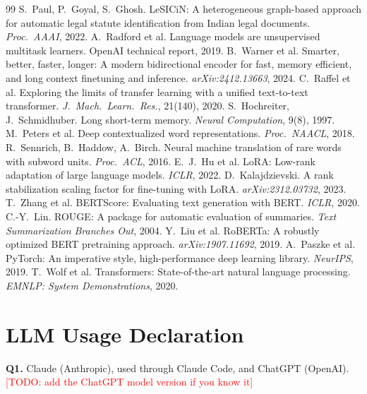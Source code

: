 \documentclass[10pt,a4paper]{article}
\newcommand{\todo}[1]{\textcolor{red}{[TODO: #1]}}
\begin{document}
\begin{thebibliography}{99}
 S.~Paul, P.~Goyal, S.~Ghosh. LeSICiN: A heterogeneous graph-based approach for automatic legal statute identification from Indian legal documents. \emph{Proc.\ AAAI}, 2022.
 A.~Radford et al. Language models are unsupervised multitask learners. OpenAI technical report, 2019.
 B.~Warner et al. Smarter, better, faster, longer: A modern bidirectional encoder for fast, memory efficient, and long context finetuning and inference. \emph{arXiv:2412.13663}, 2024.
 C.~Raffel et al. Exploring the limits of transfer learning with a unified text-to-text transformer. \emph{J.\ Mach.\ Learn.\ Res.}, 21(140), 2020.
 S.~Hochreiter, J.~Schmidhuber. Long short-term memory. \emph{Neural Computation}, 9(8), 1997.
 M.~Peters et al. Deep contextualized word representations. \emph{Proc.\ NAACL}, 2018.
 R.~Sennrich, B.~Haddow, A.~Birch. Neural machine translation of rare words with subword units. \emph{Proc.\ ACL}, 2016.
 E.~J.~Hu et al. LoRA: Low-rank adaptation of large language models. \emph{ICLR}, 2022.
 D.~Kalajdzievski. A rank stabilization scaling factor for fine-tuning with LoRA. \emph{arXiv:2312.03732}, 2023.
 T.~Zhang et al. BERTScore: Evaluating text generation with BERT. \emph{ICLR}, 2020.
 C.-Y.~Lin. ROUGE: A package for automatic evaluation of summaries. \emph{Text Summarization Branches Out}, 2004.
 Y.~Liu et al. RoBERTa: A robustly optimized BERT pretraining approach. \emph{arXiv:1907.11692}, 2019.
 A.~Paszke et al. PyTorch: An imperative style, high-performance deep learning library. \emph{NeurIPS}, 2019.
 T.~Wolf et al. Transformers: State-of-the-art natural language processing. \emph{EMNLP: System Demonstrations}, 2020.
\end{thebibliography}

\section*{LLM Usage Declaration}
\noindent\textbf{Q1.} Claude (Anthropic), used through Claude Code, and ChatGPT (OpenAI). \todo{add the ChatGPT model version if you know it}
\end{document}
